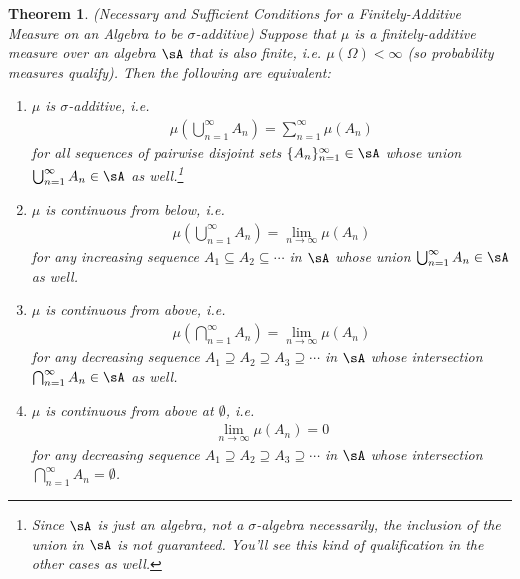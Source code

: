 \documentclass[12pt]{article}
\theoremstyle{plain}
\newtheorem{thm}{Theorem}[section]
\theoremstyle{definition}
\theoremstyle{remark}
\newcommand{\sumninf}{\sum^\infty_{n=1}}
\newcommand{\ninf}{_{n=1}^\infty}
\begin{document}
\begin{thm}
\emph{(Necessary and Sufficient Conditions for a Finitely-Additive
Measure on an Algebra to be $\sigma$-additive)}
Suppose that $\mu$ is a finitely-additive measure over an algebra $\sA$
that is also finite, i.e. $\mu(\Omega)<\infty$ (so probability measures
qualify). Then the following are equivalent:
\begin{enumerate}
  \item $\mu$ is $\sigma$-additive, i.e.
    \begin{align*}
      \mu\left(\bigcup_{n=1}^\infty A_n\right)
      =
      \sumninf \mu\left( A_n\right)
    \end{align*}
    for all sequences of pairwise disjoint sets $\{A_n\}\ninf\in\sA$
    whose union $\bigcup_{n=1}^\infty A_n\in\sA$ as well.\footnote{%
    Since $\sA$ is just an algebra, not a $\sigma$-algebra necessarily,
    the inclusion of the union in $\sA$ is not guaranteed. You'll see
    this kind of qualification in the other cases as well.}

  \item $\mu$ is continuous from below, i.e.
    \begin{align*}
      \mu\left(\bigcup^\infty_{n=1} A_n\right) =
      \lim_{n\rightarrow\infty} \mu(A_n)
    \end{align*}
    for any increasing sequence $A_1\subseteq A_2 \subseteq \cdots$ in
    $\sA$ whose union $\bigcup_{n=1}^\infty A_n\in\sA$ as well.

  \item $\mu$ is continuous from above, i.e.
    \begin{align*}
      \mu\left(\bigcap^\infty_{n=1} A_n\right)
      = \lim_{n\rightarrow\infty} \mu(A_n)
    \end{align*}
    for any decreasing sequence
    $A_1 \supseteq A_2 \supseteq A_3 \supseteq \cdots$ in $\sA$ whose
    intersection $\bigcap_{n=1}^\infty A_n \in \sA$ as well.

  \item $\mu$ is continuous from above at $\emptyset$, i.e.
    \begin{align*}
      \lim_{n\rightarrow\infty} \mu(A_n)
      =0
    \end{align*}
    for any decreasing sequence
    $A_1 \supseteq A_2 \supseteq A_3 \supseteq \cdots$ in $\sA$ whose
    intersection $\bigcap_{n=1}^\infty A_n = \emptyset$.
\end{enumerate}
\end{thm}
\end{document}
